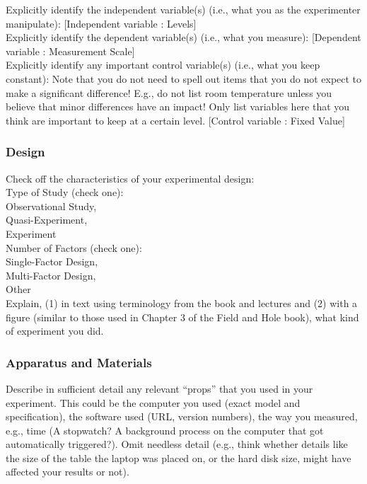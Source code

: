 \documentclass[unicode,11pt,a4paper,oneside,numbers=endperiod,openany]{scrartcl}
\begin{document}
    Explicitly identify the independent variable(s) (i.e., what you as the experimenter manipulate): 
    [Independent variable : Levels]\\
    
    Explicitly identify the dependent variable(s) (i.e., what you measure):
    [Dependent variable : Measurement Scale]\\

    Explicitly identify any important control variable(s) (i.e., what you keep constant): Note that you do not need to spell out items that you do not expect to make a significant difference! E.g., do not list room temperature unless you believe that minor differences have an impact! Only list variables here that you think are important to keep at a certain level.
    [Control variable : Fixed Value]\\


    \subsubsection{Design}

    Check off the characteristics of your experimental design:\\
    Type of Study (check one):\\
    Observational Study,\\
    Quasi-Experiment,\\
    Experiment\\
    \hfill
    Number of Factors (check one):\\
    Single-Factor Design,\\
    Multi-Factor Design,\\
    Other\\
    \hfill
    Explain, (1) in text using terminology from the book and lectures and (2) with a figure (similar to those used in Chapter 3 of the Field and Hole book), what kind of experiment you did.


    \subsubsection{Apparatus and Materials}

    Describe in sufficient detail any relevant “props” that you used in your experiment. This could be the computer you used (exact model and specification), the software used (URL, version numbers), the way you measured, e.g., time (A stopwatch? A background process on the computer that got automatically triggered?). Omit needless detail (e.g., think whether details like the size of the table the laptop was placed on, or the hard disk size, might have affected your results or not).
\end{document}
